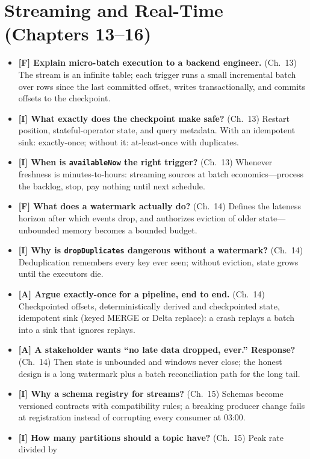 \section{Streaming and Real-Time (Chapters 13--16)}
%
\begin{itemize}
    \item \textbf{[F] Explain micro-batch execution to a backend engineer.} (Ch.~13) The
    stream is an infinite table; each trigger runs a small incremental batch over rows since
    the last committed offset, writes transactionally, and commits offsets to the checkpoint.
    \item \textbf{[I] What exactly does the checkpoint make safe?} (Ch.~13) Restart position,
    stateful-operator state, and query metadata. With an idempotent sink: exactly-once;
    without it: at-least-once with duplicates.
    \item \textbf{[I] When is \texttt{availableNow} the right trigger?} (Ch.~13) Whenever
    freshness is minutes-to-hours: streaming sources at batch economics---process the backlog,
    stop, pay nothing until next schedule.
    \item \textbf{[F] What does a watermark actually do?} (Ch.~14) Defines the lateness
    horizon after which events drop, and authorizes eviction of older state---unbounded memory
    becomes a bounded budget.
    \item \textbf{[I] Why is \texttt{dropDuplicates} dangerous without a watermark?} (Ch.~14)
    Deduplication remembers every key ever seen; without eviction, state grows until the
    executors die.
    \item \textbf{[A] Argue exactly-once for a pipeline, end to end.} (Ch.~14) Checkpointed
    offsets, deterministically derived and checkpointed state, idempotent sink (keyed MERGE or
    Delta replace): a crash replays a batch into a sink that ignores replays.
    \item \textbf{[A] A stakeholder wants ``no late data dropped, ever.'' Response?} (Ch.~14)
    Then state is unbounded and windows never close; the honest design is a long watermark
    plus a batch reconciliation path for the long tail.
    \item \textbf{[I] Why a schema registry for streams?} (Ch.~15) Schemas become versioned
    contracts with compatibility rules; a breaking producer change fails at registration
    instead of corrupting every consumer at 03:00.
    \item \textbf{[I] How many partitions should a topic have?} (Ch.~15) Peak rate divided by

\end{itemize}
